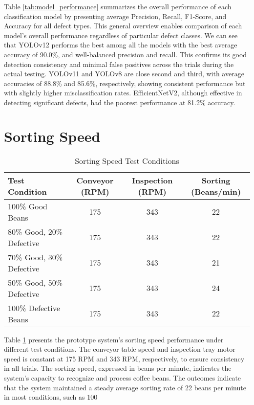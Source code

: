 Table \ref{tab:model_performance} summarizes the overall performance of each classification model by presenting average Precision, Recall, F1-Score, and Accuracy for all defect types. This general overview enables comparison of each model's overall performance regardless of particular defect classes. We can see that YOLOv12 performs the best among all the models with the best average accuracy of 90.0\%, and well-balanced precision and recall. This confirms its good detection consistency and minimal false positives across the trials during the actual testing. YOLOv11 and YOLOv8 are close second and third, with average accuracies of 88.8\% and 85.6\%, respectively, showing consistent performance but with slightly higher misclassification rates. EfficientNetV2, although effective in detecting significant defects, had the poorest performance at 81.2\% accuracy. 

\section{Sorting Speed}
\label{sec:sorting_speed}
\begin{table}[ht]
	\centering
	\small
	\caption{Sorting Speed Test Conditions}
	\label{tab:sorting_speed}
	\begin{tabularx}{\linewidth}{@{}>{\raggedright}X c c c@{}}
	\toprule
	\textbf{Test Condition} & \textbf{Conveyor (RPM)} & \textbf{Inspection (RPM)} & \textbf{Sorting (Beans/min)} \\
	\midrule
	100\% Good Beans & 175 & 343 & 22 \\
	80\% Good, 20\% Defective & 175 & 343 & 22 \\
	70\% Good, 30\% Defective & 175 & 343 & 21 \\
	50\% Good, 50\% Defective & 175 & 343 & 24 \\
	100\% Defective Beans & 175 & 343 & 22 \\
	\bottomrule
	\end{tabularx}
\end{table}
Table \ref{tab:sorting_speed} presents the prototype system's sorting speed performance under different test conditions. The conveyor table speed and inspection tray motor speed is constant at 175 RPM and 343 RPM, respectively, to ensure consistency in all trials. The sorting speed, expressed in beans per minute, indicates the system's capacity to recognize and process coffee beans. The outcomes indicate that the system maintained a steady average sorting rate of 22 beans per minute in most conditions, such as 100%
